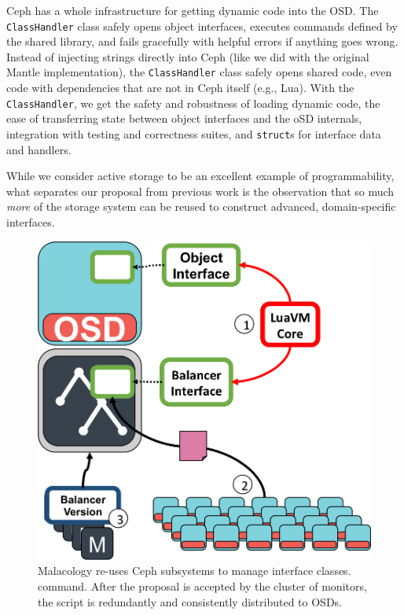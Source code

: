 \documentclass[10pt,twocolumn]{article}
\begin{document}
Ceph has a whole infrastructure for getting dynamic code into the OSD.
The \texttt{ClassHandler} class safely opens object interfaces, executes
commands defined by the shared library, and fails gracefully with
helpful errors if anything goes wrong. Instead of injecting strings
directly into Ceph (like we did with the original Mantle
implementation), the \texttt{ClassHandler} class safely opens shared
code, even code with dependencies that are not in Ceph itself (e.g.,
Lua). With the \texttt{ClassHandler}, we get the safety and robustness
of loading dynamic code, the ease of transferring state between object
interfaces and the oSD internals, integration with testing and
correctness suites, and \texttt{struct}s for interface data and
handlers.

While we consider active storage to be an excellent example of
programmability, what separates our proposal from previous work is the
observation that so much \emph{more} of the storage system can be reused
to construct advanced, domain-specific interfaces.

\begin{figure}[htbp]
\centering
\includegraphics{figures/implementation.png}
\caption{Malacology re-uses Ceph subsystems to manage interface classes.
command. After the proposal is accepted by the cluster of monitors, the
script is redundantly and consistently distributed to OSDs.
\label{fig:implementation}}
\end{figure}
\end{document}
